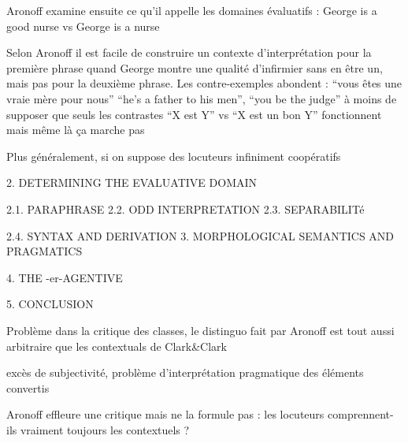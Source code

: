 \documentclass[a4paper,12pt]{article}
\begin{document}
   
Aronoff examine ensuite ce qu'il appelle les domaines évaluatifs : 
George is a good nurse vs George is a nurse

Selon Aronoff il est facile de construire un contexte d'interprétation pour la première phrase quand George montre une qualité d'infirmier sans en être
un, mais pas pour la deuxième phrase. Les contre-exemples abondent : 
``vous êtes une vraie mère pour nous'' ``he's a father to his men'', ``you be the judge'' 
à moins de supposer que seuls les contrastes ``X est Y'' vs ``X est un bon Y'' fonctionnent mais même là ça marche pas

Plus généralement, si on suppose des locuteurs infiniment coopératifs 
 
 2. DETERMINING THE EVALUATIVE DOMAIN
 
 2.1. PARAPHRASE
 2.2. ODD INTERPRETATION
 2.3. SEPARABILITé
 
 2.4. SYNTAX AND DERIVATION
 3. MORPHOLOGICAL SEMANTICS AND PRAGMATICS
 
 4. THE -er-AGENTIVE
 
 5. CONCLUSION
  
 Problème dans la critique des classes, le distinguo fait par Aronoff est tout aussi arbitraire que les contextuals de Clark\&Clark 
 
 excès de subjectivité, problème d'interprétation pragmatique des éléments convertis
 
 Aronoff effleure une critique mais ne la formule pas : les locuteurs comprennent-ils vraiment toujours les contextuels ?
 
  
\end{document}

